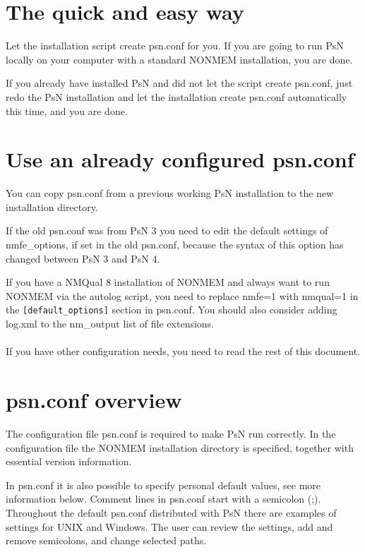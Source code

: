 
\usepackage{hyperref}


\maketitle
\tableofcontents
\newpage

\section{The quick and easy way}
Let the installation script create psn.conf for you. If you are going to run PsN locally on your computer with a standard NONMEM installation, you are done.

If you already have installed PsN and did not let the script create psn.conf, just redo the PsN installation and let the installation create psn.conf automatically this time, and you are done.

\section{Use an already configured psn.conf}
You can copy psn.conf from a previous working PsN installation to the new installation directory. 

If the old psn.conf was from PsN 3 you need to edit the default settings of nmfe\_options, if set in the old psn.conf, because the syntax of this option has changed between PsN 3 and PsN 4.

If you have a NMQual 8 installation of NONMEM and always want to run NONMEM via the autolog script, you need to replace nmfe=1 with nmqual=1 in the \verb|[default_options]| section in psn.conf. You should also consider adding log.xml to the
nm\_output list of file extensions.\\
\\If you have other configuration needs, you need to read the rest of this document.

\section{psn.conf overview}
The configuration file psn.conf is required to make PsN run correctly. In the configuration file the NONMEM installation directory is specified, together with essential version information. 

In psn.conf it is also possible to specify personal default values, see more information below. Comment lines in psn.conf start with a semicolon (;). Throughout the default psn.conf distributed with PsN there are examples of settings for UNIX and Windows. The user can review the settings, add and remove semicolons, and change selected paths.

